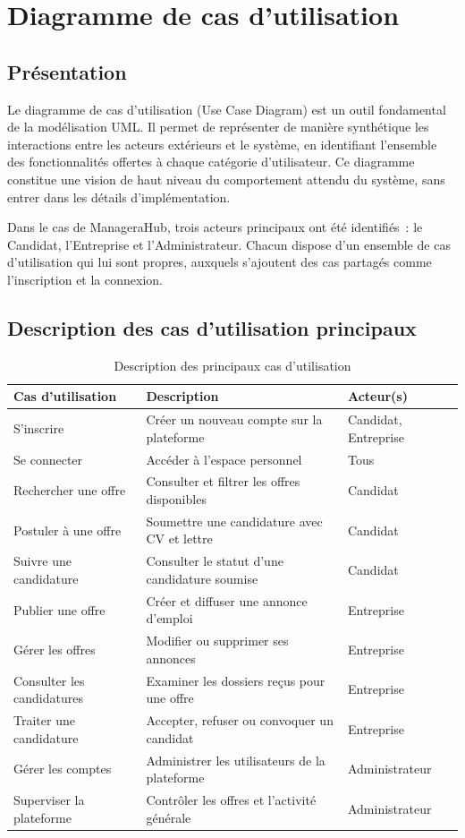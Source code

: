 \documentclass[12pt,a4paper]{report}
\begin{document}
\section{Diagramme de cas d'utilisation}

\subsection{Présentation}

Le diagramme de cas d'utilisation (Use Case Diagram) est un outil fondamental de la modélisation UML. Il permet de représenter de manière synthétique les interactions entre les acteurs extérieurs et le système, en identifiant l'ensemble des fonctionnalités offertes à chaque catégorie d'utilisateur. Ce diagramme constitue une vision de haut niveau du comportement attendu du système, sans entrer dans les détails d'implémentation.

Dans le cas de ManageraHub, trois acteurs principaux ont été identifiés~: le Candidat, l'Entreprise et l'Administrateur. Chacun dispose d'un ensemble de cas d'utilisation qui lui sont propres, auxquels s'ajoutent des cas partagés comme l'inscription et la connexion.

\subsection{Description des cas d'utilisation principaux}

\begin{table}[H]
\centering
\caption{Description des principaux cas d'utilisation}
\begin{tabularx}{\textwidth}{lXl}
\toprule
\textbf{Cas d'utilisation} & \textbf{Description} & \textbf{Acteur(s)} \\
\midrule
S'inscrire & Créer un nouveau compte sur la plateforme & Candidat, Entreprise \\
Se connecter & Accéder à l'espace personnel & Tous \\
Rechercher une offre & Consulter et filtrer les offres disponibles & Candidat \\
Postuler à une offre & Soumettre une candidature avec CV et lettre & Candidat \\
Suivre une candidature & Consulter le statut d'une candidature soumise & Candidat \\
Publier une offre & Créer et diffuser une annonce d'emploi & Entreprise \\
Gérer les offres & Modifier ou supprimer ses annonces & Entreprise \\
Consulter les candidatures & Examiner les dossiers reçus pour une offre & Entreprise \\
Traiter une candidature & Accepter, refuser ou convoquer un candidat & Entreprise \\
Gérer les comptes & Administrer les utilisateurs de la plateforme & Administrateur \\
Superviser la plateforme & Contrôler les offres et l'activité générale & Administrateur \\
\bottomrule
\end{tabularx}
\end{table}
\end{document}
